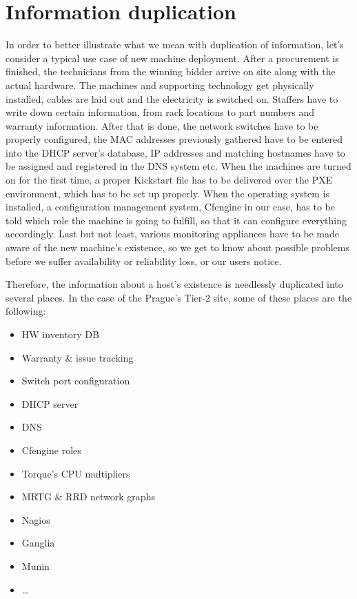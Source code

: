 \documentclass[11pt]{article}
\begin{document}
\section{Information duplication}

In order to better illustrate what we mean with duplication of information,
let's consider a typical use case of new machine deployment.  After a
procurement is finished, the technicians from the winning bidder arrive
on site along with the actual hardware.  The machines and supporting technology
get physically installed, cables are laid out and the electricity is switched
on.  Staffers have to write down certain information, from rack locations to
part numbers and warranty information.  After that is done, the network switches
have to be properly configured, the MAC addresses previously gathered have to be
entered into the DHCP server's database, IP addresses and matching hostnames
have to be assigned and registered in the DNS system etc.  When the machines are
turned on for the first time, a proper Kickstart file has to be delivered over
the PXE environment, which has to be set up properly.  When the operating system
is installed, a configuration management system, Cfengine in our case, has to be
told which role the machine is going to fulfill, so that it can configure
everything accordingly.  Last but not least, various monitoring appliances have
to be made aware of the new machine's existence, so we get to know about
possible problems before we suffer availability or reliability loss, or our
users notice.

Therefore, the information about a host's existence is needlessly duplicated
into several places.  In the case of the Prague's Tier-2 site, some of these
places are the following:

\begin{itemize}
    \item HW inventory DB
    \item Warranty \& issue tracking
    \item Switch port configuration
    \item DHCP server
    \item DNS
    \item Cfengine roles
    \item Torque's CPU multipliers
    \item MRTG \& RRD network graphs
    \item Nagios
    \item Ganglia
    \item Munin
    \item \ldots
\end{itemize}
\end{document}
